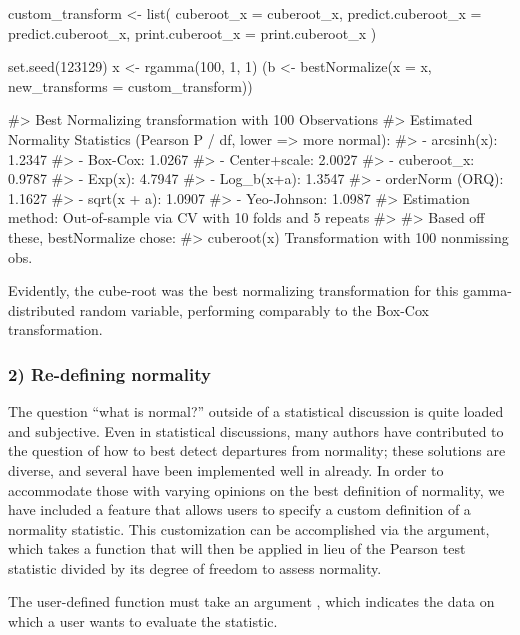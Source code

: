 \begin{Schunk}
\begin{Sinput}
custom_transform <- list(
  cuberoot_x = cuberoot_x,
  predict.cuberoot_x = predict.cuberoot_x,
  print.cuberoot_x = print.cuberoot_x
)

set.seed(123129)
x <- rgamma(100, 1, 1)
(b <- bestNormalize(x = x, new_transforms = custom_transform))
\end{Sinput}
\begin{Soutput}
#> Best Normalizing transformation with 100 Observations
#>  Estimated Normality Statistics (Pearson P / df, lower => more normal):
#>  - arcsinh(x): 1.2347
#>  - Box-Cox: 1.0267
#>  - Center+scale: 2.0027
#>  - cuberoot_x: 0.9787
#>  - Exp(x): 4.7947
#>  - Log_b(x+a): 1.3547
#>  - orderNorm (ORQ): 1.1627
#>  - sqrt(x + a): 1.0907
#>  - Yeo-Johnson: 1.0987
#> Estimation method: Out-of-sample via CV with 10 folds and 5 repeats
#>  
#> Based off these, bestNormalize chose:
#> cuberoot(x) Transformation with 100 nonmissing obs.
\end{Soutput}
\end{Schunk}

Evidently, the cube-root was the best normalizing transformation for
this gamma-distributed random variable, performing comparably to the
Box-Cox transformation.

\hypertarget{re-defining-normality}{%
\subsubsection{2) Re-defining normality}\label{re-defining-normality}}

The question ``what is normal?'' outside of a statistical discussion is
quite loaded and subjective. Even in statistical discussions, many
authors have contributed to the question of how to best detect
departures from normality; these solutions are diverse, and several have
been implemented well in  already. In order to accommodate
those with varying opinions on the best definition of normality, we have
included a feature that allows users to specify a custom definition of a
normality statistic. This customization can be accomplished via the
 argument, which takes
a function that will then be applied in lieu of the Pearson test
statistic divided by its degree of freedom to assess normality.

The user-defined function must take an argument , which
indicates the data on which a user wants to evaluate the statistic.

